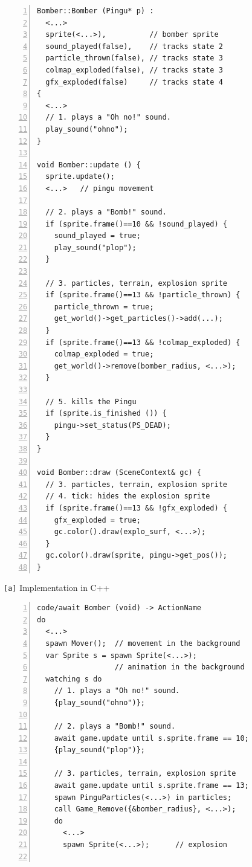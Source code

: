 \documentclass{vgtc}                          %
\newcommand{\code}[1] {{\small{\texttt{#1}}}}
\newcommand{\ax}{\code{[a]}\xspace}
\begin{document}
\begin{figure}[th!]
\begin{minipage}[t]{0.50\linewidth}
\begin{lstlisting}[numbers=left,xleftmargin=3em]
Bomber::Bomber (Pingu* p) :
  <...>
  sprite(<...>),          // bomber sprite
  sound_played(false),    // tracks state 2
  particle_thrown(false), // tracks state 3
  colmap_exploded(false), // tracks state 3
  gfx_exploded(false)     // tracks state 4
{
  <...>
  // 1. plays a "Oh no!" sound.
  play_sound("ohno");
}

void Bomber::update () {
  sprite.update();
  <...>   // pingu movement

  // 2. plays a "Bomb!" sound.
  if (sprite.frame()==10 && !sound_played) {
    sound_played = true;
    play_sound("plop");
  }

  // 3. particles, terrain, explosion sprite
  if (sprite.frame()==13 && !particle_thrown) {
    particle_thrown = true;
    get_world()->get_particles()->add(...);
  }
  if (sprite.frame()==13 && !colmap_exploded) {
    colmap_exploded = true;
    get_world()->remove(bomber_radius, <...>);
  }

  // 5. kills the Pingu
  if (sprite.is_finished ()) {
    pingu->set_status(PS_DEAD);
  }
}

void Bomber::draw (SceneContext& gc) {
  // 3. particles, terrain, explosion sprite
  // 4. tick: hides the explosion sprite
  if (sprite.frame()==13 && !gfx_exploded) {
    gfx_exploded = true;
    gc.color().draw(explo_surf, <...>);
  }
  gc.color().draw(sprite, pingu->get_pos());
}
\end{lstlisting}
\centering\small{\ax Implementation in C++}
\end{minipage}
%
\begin{minipage}[t]{0.50\linewidth}
\begin{lstlisting}[numbers=left,xleftmargin=3em]
code/await Bomber (void) -> ActionName
do
  <...>
  spawn Mover();  // movement in the background
  var Sprite s = spawn Sprite(<...>);
                  // animation in the background
  watching s do
    // 1. plays a "Oh no!" sound.
    {play_sound("ohno")};

    // 2. plays a "Bomb!" sound.
    await game.update until s.sprite.frame == 10;
    {play_sound("plop")};

    // 3. particles, terrain, explosion sprite
    await game.update until s.sprite.frame == 13;
    spawn PinguParticles(<...>) in particles;
    call Game_Remove({&bomber_radius}, <...>);
    do
      <...>
      spawn Sprite(<...>);      // explosion


\end{lstlisting}
\end{minipage}
\end{figure}
\end{document}
